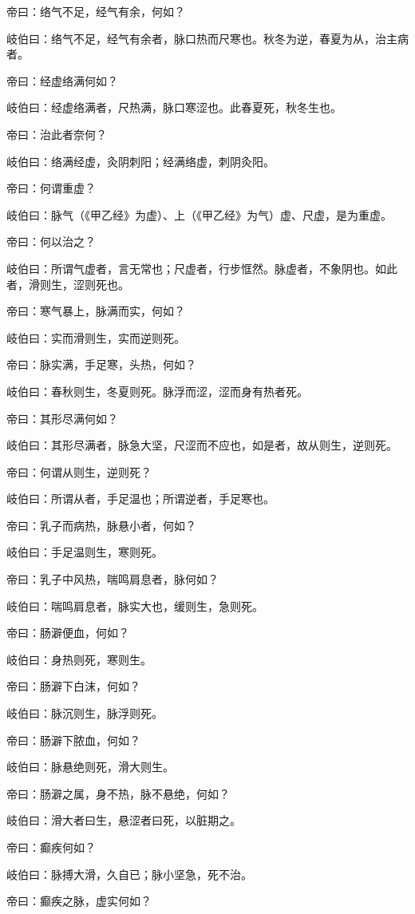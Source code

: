 \documentclass{article}%
\begin{document}
帝曰：络气不足，经气有余，何如？

岐伯曰：络气不足，经气有余者，脉口热而尺寒也。秋冬为逆，春夏为从，治主病者。

帝曰：经虚络满何如？

岐伯曰：经虚络满者，尺热满，脉口寒涩也。此春夏死，秋冬生也。

帝曰：治此者奈何？

岐伯曰：络满经虚，灸阴刺阳；经满络虚，刺阴灸阳。

帝曰：何谓重虚？

岐伯曰：脉气（《甲乙经》为虚）、上（《甲乙经》为气）虚、尺虚，是为重虚。

帝曰：何以治之？

岐伯曰：所谓气虚者，言无常也；尺虚者，行步恇然。脉虚者，不象阴也。如此者，滑则生，涩则死也。

帝曰：寒气暴上，脉满而实，何如？

岐伯曰：实而滑则生，实而逆则死。

帝曰：脉实满，手足寒，头热，何如？

岐伯曰：春秋则生，冬夏则死。脉浮而涩，涩而身有热者死。

帝曰：其形尽满何如？

岐伯曰：其形尽满者，脉急大坚，尺涩而不应也，如是者，故从则生，逆则死。

帝曰：何谓从则生，逆则死？

岐伯曰：所谓从者，手足温也；所谓逆者，手足寒也。

帝曰：乳子而病热，脉悬小者，何如？

岐伯曰：手足温则生，寒则死。

帝曰：乳子中风热，喘鸣肩息者，脉何如？

岐伯曰：喘鸣肩息者，脉实大也，缓则生，急则死。

帝曰：肠澼便血，何如？

岐伯曰：身热则死，寒则生。

帝曰：肠澼下白沫，何如？

岐伯曰：脉沉则生，脉浮则死。

帝曰：肠澼下脓血，何如？

岐伯曰：脉悬绝则死，滑大则生。

帝曰：肠澼之属，身不热，脉不悬绝，何如？

岐伯曰：滑大者曰生，悬涩者曰死，以脏期之。

帝曰：癫疾何如？

岐伯曰：脉搏大滑，久自已；脉小坚急，死不治。

帝曰：癫疾之脉，虚实何如？
\end{document}
